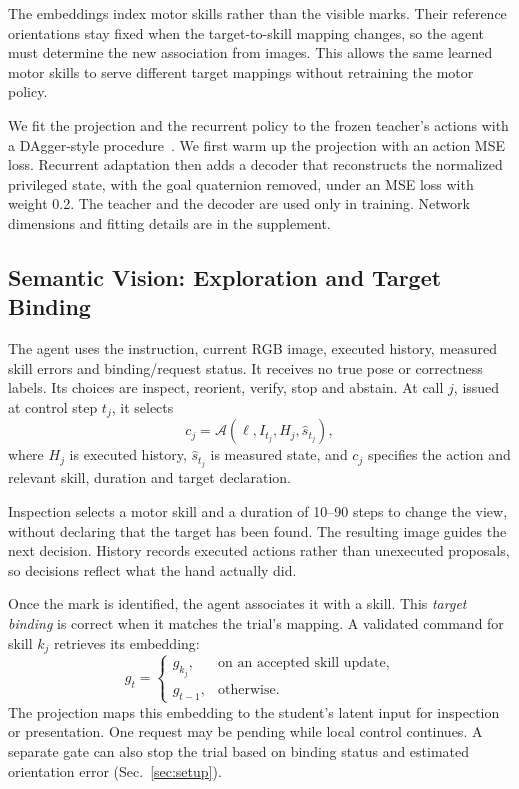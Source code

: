 The embeddings index motor skills rather than the visible marks. Their reference orientations stay fixed when the target-to-skill mapping changes, so the agent must determine the new association from images. This allows the same learned motor skills to serve different target mappings without retraining the motor policy.

We fit the projection and the recurrent policy to the frozen teacher's actions with a DAgger-style procedure~\cite{ross2011dagger}. We first warm up the projection with an action MSE loss. Recurrent adaptation then adds a decoder that reconstructs the normalized privileged state, with the goal quaternion removed, under an MSE loss with weight 0.2. The teacher and the decoder are used only in training. Network dimensions and fitting details are in the supplement.

\subsection{Semantic Vision: Exploration and Target Binding}
\label{sec:exploration}

The agent uses the instruction, current RGB image, executed history, measured skill errors and binding/request status. It receives no true pose or correctness labels. Its choices are inspect, reorient, verify, stop and abstain. At call $j$, issued at control step $t_j$, it selects
\begin{equation}
 c_j=\mathcal{A}(\ell,I_{t_j},H_j,\hat{s}_{t_j}),
 \label{eq:agent-decision}
\end{equation}
where $H_j$ is executed history, $\hat{s}_{t_j}$ is measured state, and $c_j$ specifies the action and relevant skill, duration and target declaration.

Inspection selects a motor skill and a duration of 10--90 steps to change the view, without declaring that the target has been found. The resulting image guides the next decision. History records executed actions rather than unexecuted proposals, so decisions reflect what the hand actually did.

Once the mark is identified, the agent associates it with a skill. This \emph{target binding} is correct when it matches the trial's mapping. A validated command for skill $k_j$ retrieves its embedding:
\begin{equation}
 g_t=\begin{cases}
 g_{k_j},&\text{on an accepted skill update},\\
 g_{t-1},&\text{otherwise}.
 \end{cases}
 \label{eq:agent-goal-update}
\end{equation}
The projection maps this embedding to the student's latent input for inspection or presentation. One request may be pending while local control continues. A separate gate can also stop the trial based on binding status and estimated orientation error (Sec.~\ref{sec:setup}).

